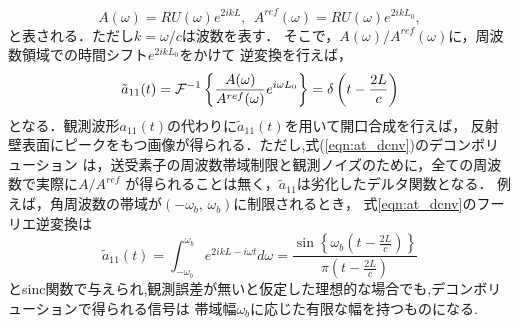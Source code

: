 \documentclass[10pt,a4j,dvipdfmx]{jarticle}
\begin{document}
\begin{equation}
	A(\omega) = RU(\omega) e^{2ik L},  \ \
	A^{ref}(\omega) = RU(\omega) e^{2ik L_0}, 
	\label{eqn:}
\end{equation}
と表される．ただし$k=\omega/c$は波数を表す．
そこで，$A(\omega)/A^{ref}(\omega)$に，周波数領域での時間シフト$e^{2ikL_0}$をかけて
逆変換を行えば，
\begin{equation}
	\tilde a_{11}(t)= {\cal F}^{-1} \left\{ 
	\frac{A(\omega)}{A^{ref}(\omega)} e ^{i\omega L_0}
	\right\}
	=\delta \left(t-\frac{2L}{c}\right)
	\label{eqn:at_dcnv}
\end{equation}
となる．観測波形$a_{11}(t)$の代わりに$\tilde a_{11}(t)$を用いて開口合成を行えば，
反射壁表面にピークをもつ画像が得られる．ただし,式(\ref{eqn:at_dcnv})のデコンボリューション
は，送受素子の周波数帯域制限と観測ノイズのために，全ての周波数で実際に$A/A^{ref}$
が得られることは無く，$\tilde a_{11}$は劣化したデルタ関数となる．
例えば，角周波数の帯域が$(-\omega_b,\, \omega_b)$に制限されるとき，
式\ref{eqn:at_dcnv}のフーリエ逆変換は
\begin{equation}
	\tilde a_{11}(t)= 
	\int_{-\omega_b}^{\omega_b} 
	e^{2ikL-i\omega t} d\omega 
	=\frac{\sin\left\{ \omega_b \left( t-\frac{2L}{c}\right)\right\}}{\pi \left(t-\frac{2L}{c}\right)}
	\label{eqn:}
\end{equation}
とsinc関数で与えられ,観測誤差が無いと仮定した理想的な場合でも,デコンボリューションで得られる信号は
帯域幅$\omega_b$に応じた有限な幅を持つものになる.
\end{document}
